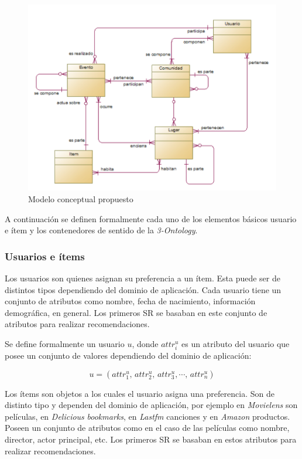 \begin{figure}[tp]
	\centering
	\includegraphics[scale=.4]{images/derpropuesto.png}
	\caption{Modelo conceptual propuesto}
	\label{fig:derpropuesto}
\end{figure}

A continuación se definen formalmente cada uno de los elementos básicos usuario e ítem y los contenedores de sentido de la \textit{3-Ontology}.

\subsubsection{Usuarios e \'items}

Los usuarios son quienes asignan su preferencia a un ítem. Esta puede ser de distintos tipos dependiendo del dominio de aplicación. Cada usuario tiene un conjunto de atributos como nombre, fecha de nacimiento, información demográfica, en general. Los primeros SR se basaban en este conjunto de atributos para realizar recomendaciones.

Se define formalmente un usuario $u$, donde $attr_i^{u}$ es un atributo del usuario que posee un conjunto de valores dependiendo del dominio de aplicación:

\begin{equation}
\label{modelo:user}
	u = (attr_1^{u},\,attr_2^{u},\,attr_3^{u},\cdots,\,attr_n^{u})
\end{equation}

Los ítems son objetos a los cuales el usuario asigna una preferencia. Son de distinto tipo y dependen del dominio de aplicación, por ejemplo en \textit{Movielens} son películas, en \textit{Delicious} \textit{bookmarks}, en \textit{Lastfm} canciones y en \textit{Amazon} productos. Poseen un conjunto de atributos como en el caso de las películas como nombre, director, actor principal, etc. Los primeros SR se basaban en estos atributos para realizar recomendaciones.

